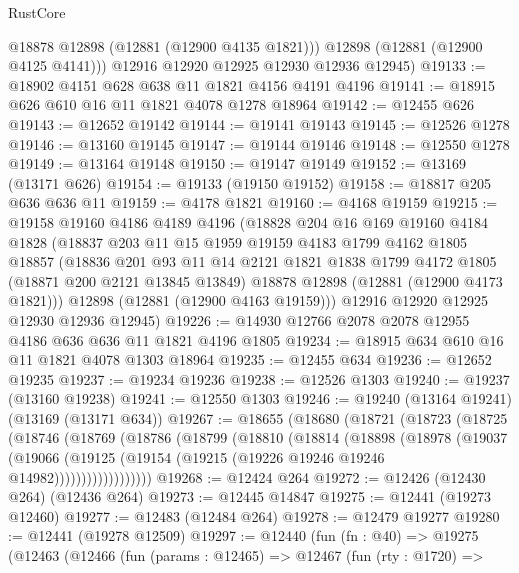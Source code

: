 \begin{lexlean}{RustCore}
\begin{coremodule}
          @18878
          @12898
          (@12881 (@12900 @4135 @1821)))
        @12898
        (@12881 (@12900 @4125 @4141)))
      @12916
      @12920
      @12925
      @12930
      @12936
      @12945)
@19133 := @18902 @4151 @628 @638 @11 @1821 @4156 @4191 @4196
@19141 := @18915 @626 @610 @16 @11 @1821 @4078 @1278 @18964
@19142 := @12455 @626
@19143 := @12652 @19142
@19144 := @19141 @19143
@19145 := @12526 @1278
@19146 := @13160 @19145
@19147 := @19144 @19146
@19148 := @12550 @1278
@19149 := @13164 @19148
@19150 := @19147 @19149
@19152 := @13169 (@13171 @626)
@19154 := @19133 (@19150 @19152)
@19158 := @18817 @205 @636 @636 @11
@19159 := @4178 @1821
@19160 := @4168 @19159
@19215 := @19158
    @19160
    @4186
    @4189
    @4196
    (@18828
      @204
      @16
      @169
      @19160
      @4184
      @1828
      (@18837
        @203
        @11
        @15
        @1959
        @19159
        @4183
        @1799
        @4162
        @1805
        @18857
        (@18836
          @201
          @93
          @11
          @14
          @2121
          @1821
          @1838
          @1799
          @4172
          @1805
          (@18871 @200 @2121 @13845 @13849)
          @18878
          @12898
          (@12881 (@12900 @4173 @1821)))
        @12898
        (@12881 (@12900 @4163 @19159)))
      @12916
      @12920
      @12925
      @12930
      @12936
      @12945)
@19226 := @14930 @12766 @2078 @2078 @12955 @4186 @636 @636 @11 @1821 @4196 @1805
@19234 := @18915 @634 @610 @16 @11 @1821 @4078 @1303 @18964
@19235 := @12455 @634
@19236 := @12652 @19235
@19237 := @19234 @19236
@19238 := @12526 @1303
@19240 := @19237 (@13160 @19238)
@19241 := @12550 @1303
@19246 := @19240 (@13164 @19241) (@13169 (@13171 @634))
@19267 := @18655
    (@18680
      (@18721
        (@18723
          (@18725
            (@18746
              (@18769
                (@18786
                  (@18799
                    (@18810
                      (@18814
                        (@18898
                          (@18978
                            (@19037
                              (@19066
                                (@19125
                                  (@19154 (@19215 (@19226 @19246 @19246 @14982))))))))))))))))))
@19268 := @12424 @264
@19272 := @12426 (@12430 @264) (@12436 @264)
@19273 := @12445 @14847
@19275 := @12441 (@19273 @12460)
@19277 := @12483 (@12484 @264)
@19278 := @12479 @19277
@19280 := @12441 (@19278 @12509)
@19297 := @12440
    (fun (fn : @40) =>
    @19275
      (@12463
        (@12466
          (fun (params : @12465) =>
          @12467
            (fun (rty : @1720) =>

\end{coremodule}
\end{lexlean}
